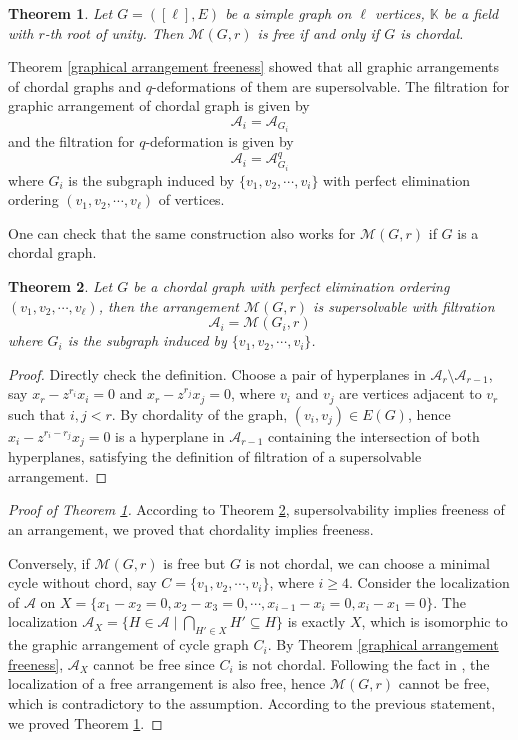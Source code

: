 \documentclass[12pt]{article}
\theoremstyle{plain}%
\newtheorem{theorem}{Theorem}[section]
\theoremstyle{definition}
\begin{document}
\begin{theorem}\label{chordality is freeness}
    Let $G=([\ell], E)$ be a simple graph on $\ell$ vertices, $\mathbb{K}$ be a field with $r$-th root of unity. Then $\mathcal{M}(G,r)$ is free if and only if $G$ is chordal.
\end{theorem}

Theorem \ref{graphical arrangement freeness} showed that all graphic arrangements of chordal graphs and $q$-deformations of them are supersolvable. The filtration for graphic arrangement of chordal graph is given by 
$$\mathcal{A}_i=\mathcal{A}_{G_i}$$
and the filtration for $q$-deformation is given by
$$\mathcal{A}_i=\mathcal{A}_{G_i}^q$$
where $G_i$ is the subgraph induced by $\{v_1,v_2,\cdots,v_i\}$ with perfect elimination ordering $(v_1,v_2,\cdots,v_\ell)$ of vertices.

One can check that the same construction also works for $\mathcal{M}(G,r)$ if $G$ is a chordal graph.


\begin{theorem}\label{filtration}
    Let $G$ be a chordal graph with perfect elimination ordering $(v_1,v_2,\cdots,v_\ell)$, then the arrangement $\mathcal{M}(G,r)$ is supersolvable with filtration
    $$\mathcal{A}_i=\mathcal{M}({G_i},r)$$
    where $G_i$ is the subgraph induced by $\{v_1,v_2,\cdots,v_i\}$.
\end{theorem}

\begin{proof}
    Directly check the definition. Choose a pair of hyperplanes in $\mathcal{A}_r\setminus\mathcal{A}_{r-1}$, say $x_r-z^{r_i}x_i=0$ and $x_r-z^{r_j}x_j=0$, where $v_i$ and $v_j$ are vertices adjacent to $v_r$ such that $i,j<r$. By chordality of the graph, $(v_i,v_j)\in E(G)$, hence $x_i-z^{r_i-r_j}x_j=0$ is a hyperplane in $\mathcal{A}_{r-1}$ containing the intersection of both hyperplanes, satisfying the definition of filtration of a supersolvable arrangement.
\end{proof}

\begin{proof}[Proof of Theorem \ref{chordality is freeness}]
    

According to Theorem \ref{filtration}, supersolvability implies freeness of an arrangement, we proved that chordality implies freeness.

Conversely, if $\mathcal{M}(G,r)$ is free but $G$ is not chordal, we can choose a minimal cycle without chord, say $C=\{v_1,v_2,\cdots,v_i\}$, where $i\geq 4$. Consider the localization of $\mathcal{A}$ on $X=\{x_1-x_2=0, x_2-x_3=0, \cdots, x_{i-1}-x_i=0, x_i-x_1=0\}$. The localization $\mathcal{A}_X=\{H\in\mathcal{A}\mid \bigcap_{H'\in X} H'\subseteq H\}$ is exactly $X$, which is isomorphic to the graphic arrangement of cycle graph $C_i$. By Theorem \ref{graphical arrangement freeness}, $\mathcal{A}_X$ cannot be free since $C_i$ is not chordal. Following the fact in \cite{orlik1992arrangements}, the localization of a free arrangement is also free, hence $\mathcal{M}(G,r)$ cannot be free, which is contradictory to the assumption. According to the previous statement, we proved Theorem \ref{chordality is freeness}.
\end{proof}
\end{document}
